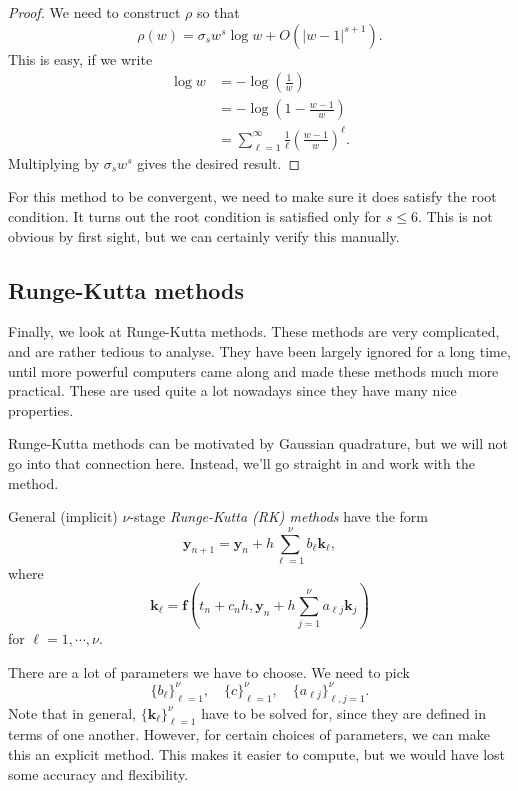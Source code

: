 \documentclass[a4paper]{article}
\begin{document}
\begin{proof}
  We need to construct $\rho$ so that
  \[
    \rho(w) = \sigma_s w^s \log w + O(|w - 1|^{s + 1}).
  \]
  This is easy, if we write
  \begin{align*}
    \log w &= - \log\left(\frac{1}{w}\right)\\
    &= -\log \left(1 - \frac{w - 1}{w}\right)\\
    &= \sum_{\ell = 1}^\infty \frac{1}{\ell} \left(\frac{w - 1}{w}\right)^\ell.
  \end{align*}
  Multiplying by $\sigma_s w^s$ gives the desired result.
\end{proof}
For this method to be convergent, we need to make sure it does satisfy the root condition. It turns out the root condition is satisfied only for $s \leq 6$. This is not obvious by first sight, but we can certainly verify this manually.

\subsection{Runge-Kutta methods}
Finally, we look at Runge-Kutta methods. These methods are very complicated, and are rather tedious to analyse. They have been largely ignored for a long time, until more powerful computers came along and made these methods much more practical. These are used quite a lot nowadays since they have many nice properties.

Runge-Kutta methods can be motivated by Gaussian quadrature, but we will not go into that connection here. Instead, we'll go straight in and work with the method.

\begin{defi}
  General (implicit) $\nu$-stage \emph{Runge-Kutta (RK) methods} have the form
  \[
    \mathbf{y}_{n + 1} = \mathbf{y}_n + h \sum_{\ell = 1}^\nu b_\ell \mathbf{k}_\ell,
  \]
  where
  \[
    \mathbf{k}_\ell = \mathbf{f}\left(t_n + c_n h, \mathbf{y}_n + h\sum_{j = 1}^\nu a_{\ell j} \mathbf{k}_j\right)
  \]
  for $\ell = 1, \cdots, \nu$.
\end{defi}
There are a lot of parameters we have to choose. We need to pick
\[
  \{b_\ell\}_{\ell = 1}^\nu,\quad \{c\}_{\ell = 1}^\nu,\quad \{a_{\ell j}\}_{\ell, j = 1}^\nu.
\]
Note that in general, $\{\mathbf{k}_{\ell}\}_{\ell = 1}^\nu$ have to be solved for, since they are defined in terms of one another. However, for certain choices of parameters, we can make this an explicit method. This makes it easier to compute, but we would have lost some accuracy and flexibility.
\end{document}
